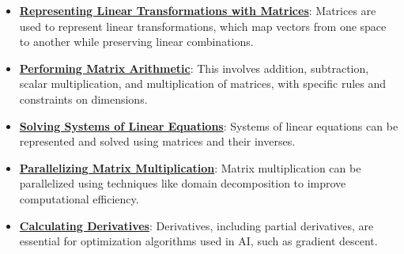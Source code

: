 \documentclass{article}%
\begin{document}
\begin{itemize}[leftmargin=*]%
\item \href{https://purdue.brightspace.com/d2l/common/assets/pdfjs-d2l-dist/1.0.14-legacy/web/viewer.html?file=\%2Fcontent\%2Fenforced\%2F1095467-wl.202510.CS.24300.001\%2F04L1-Linear Algebra Primer.pdf\%3Fou\%3D1095467\&lang=en-us\&container=d2l-fileviewer-rendered-pdf\&fullscreen=d2l-fileviewer-rendered-pdf-dialog\&height=667#page=5}{\textbf{Representing Linear Transformations with Matrices}}: Matrices are used to represent linear transformations, which map vectors from one space to another while preserving linear combinations.%
\item \href{https://purdue.brightspace.com/d2l/common/assets/pdfjs-d2l-dist/1.0.14-legacy/web/viewer.html?file=\%2Fcontent\%2Fenforced\%2F1095467-wl.202510.CS.24300.001\%2F04L1-Linear Algebra Primer.pdf\%3Fou\%3D1095467\&lang=en-us\&container=d2l-fileviewer-rendered-pdf\&fullscreen=d2l-fileviewer-rendered-pdf-dialog\&height=667#page=9}{\textbf{Performing Matrix Arithmetic}}: This involves addition, subtraction, scalar multiplication, and multiplication of matrices, with specific rules and constraints on dimensions.%
\item \href{https://purdue.brightspace.com/d2l/common/assets/pdfjs-d2l-dist/1.0.14-legacy/web/viewer.html?file=\%2Fcontent\%2Fenforced\%2F1095467-wl.202510.CS.24300.001\%2F04L1-Linear Algebra Primer.pdf\%3Fou\%3D1095467\&lang=en-us\&container=d2l-fileviewer-rendered-pdf\&fullscreen=d2l-fileviewer-rendered-pdf-dialog\&height=667#page=11}{\textbf{Solving Systems of Linear Equations}}: Systems of linear equations can be represented and solved using matrices and their inverses.%
\item \href{https://purdue.brightspace.com/d2l/common/assets/pdfjs-d2l-dist/1.0.14-legacy/web/viewer.html?file=\%2Fcontent\%2Fenforced\%2F1095467-wl.202510.CS.24300.001\%2F04L1-Linear Algebra Primer.pdf\%3Fou\%3D1095467\&lang=en-us\&container=d2l-fileviewer-rendered-pdf\&fullscreen=d2l-fileviewer-rendered-pdf-dialog\&height=667#page=18}{\textbf{Parallelizing Matrix Multiplication}}: Matrix multiplication can be parallelized using techniques like domain decomposition to improve computational efficiency.%
\item \href{https://purdue.brightspace.com/d2l/common/assets/pdfjs-d2l-dist/1.0.14-legacy/web/viewer.html?file=\%2Fcontent\%2Fenforced\%2F1095467-wl.202510.CS.24300.001\%2F04L1-Linear Algebra Primer.pdf\%3Fou\%3D1095467\&lang=en-us\&container=d2l-fileviewer-rendered-pdf\&fullscreen=d2l-fileviewer-rendered-pdf-dialog\&height=667#page=19}{\textbf{Calculating Derivatives}}: Derivatives, including partial derivatives, are essential for optimization algorithms used in AI, such as gradient descent.%

\end{itemize}
\end{document}
